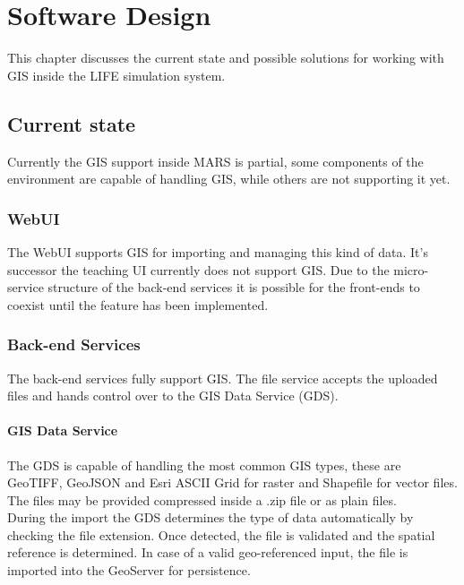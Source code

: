 
\chapter{Software Design}
This chapter discusses the current state and possible solutions for working with GIS inside the LIFE simulation system.



\section{Current state}
Currently the GIS support inside MARS is partial, some components of the environment are capable of handling GIS, while others are not supporting it yet.


\subsection{WebUI}
The WebUI supports GIS for importing and managing this kind of data. It's successor the teaching UI currently does not support GIS. Due to the micro-service structure of the back-end services it is possible for the front-ends to coexist until the feature has been implemented.

\subsection{Back-end Services}
The back-end services fully support GIS. The file service accepts the uploaded files and hands control over to the GIS Data Service (GDS). 

\subsubsection{GIS Data Service}
The GDS is capable of handling the most common GIS types, these are GeoTIFF, GeoJSON and Esri ASCII Grid for raster and Shapefile for vector files. The files may be provided compressed inside a .zip file or as plain files.\\
During the import the GDS determines the type of data automatically by checking the file extension. Once detected, the file is validated and the spatial reference is determined. In case of a valid geo-referenced input, the file is imported into the GeoServer for persistence.


